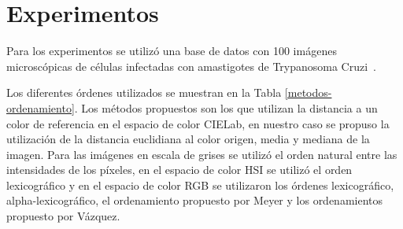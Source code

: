 \section{Experimentos}
Para los experimentos se utilizó una base de datos con 100 imágenes microscópicas de células infectadas con amastigotes de Trypanosoma Cruzi~\cite{noguera2013mathematical}.

Los diferentes órdenes  utilizados se muestran en la Tabla \ref{metodos-ordenamiento}. Los métodos propuestos son los que utilizan la distancia a un color de referencia en el espacio de color CIELab, en nuestro caso se propuso la utilización de la distancia euclidiana al color origen, media y mediana de la imagen. Para las imágenes en escala de grises se utilizó el orden natural entre las intensidades de los píxeles, en el espacio de color HSI se utilizó el orden lexicográfico y en el espacio de color RGB se utilizaron los órdenes lexicográfico, alpha-lexicográfico, el ordenamiento propuesto por Meyer y los ordenamientos propuesto por Vázquez.


